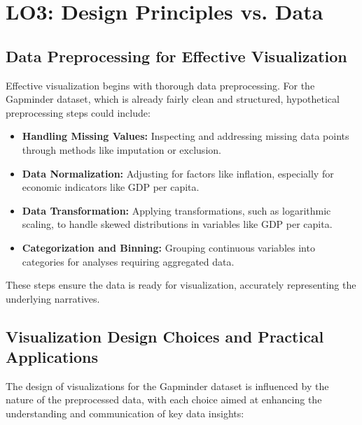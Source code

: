 \section{LO3: Design Principles vs. Data}

\subsection{Data Preprocessing for Effective Visualization}
Effective visualization begins with thorough data preprocessing. For the Gapminder dataset, which is already fairly clean and structured, hypothetical preprocessing steps could include:

\begin{itemize}
\item \textbf{Handling Missing Values:} Inspecting and addressing missing data points through methods like imputation or exclusion.
\item \textbf{Data Normalization:} Adjusting for factors like inflation, especially for economic indicators like GDP per capita.
\item \textbf{Data Transformation:} Applying transformations, such as logarithmic scaling, to handle skewed distributions in variables like GDP per capita.
\item \textbf{Categorization and Binning:} Grouping continuous variables into categories for analyses requiring aggregated data.
\end{itemize}

These steps ensure the data is ready for visualization, accurately representing the underlying narratives.

\subsection{Visualization Design Choices and Practical Applications}
The design of visualizations for the Gapminder dataset is influenced by the nature of the preprocessed data, with each choice aimed at enhancing the understanding and communication of key data insights:

